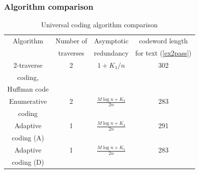 \documentclass[14pt]{beamer}
\begin{document}
\begin{frame}
\frametitle{Algorithm comparison}
\begin{itemize}    
    
\footnotesize {
 
    \begin{table}[htbp]
    \caption{Universal coding algorithm comparison}
    \begin{center}
    \begin{tabular}
    {|c|c|c|c|}  \hline %
    Algorithm & Number of  & Asymptotic &   codeword length  \\ %
              & traverses  & redundancy &   for text (\ref{ex2pass})    \\%
    \hline %
    2-traverse  & 2& $1 + K_1 / n$& 302 \\%
    coding, &  &  &  \\ %
    Huffman code &  &  &  \\ \hline%
    Enumerative & 2& $\frac{M\log n + K_3 }{2n}$& 283 \\ %
    coding      &  &  &  \\\hline %
     Adaptive & 1& $\frac{M\log n + K_4 }{2n}$& 291 \\%
     coding (A) &  &  &   \\\hline %
    Adaptive  & 1& $\frac{M\log n + K_5 }{2n}$&283 \\%
    coding (D) &  &  &  \\\hline
    \end{tabular}
    \label{tab3_6} \end{center}
    \end{table}
}    
    
\end{itemize}
\end{frame}

\end{document}
